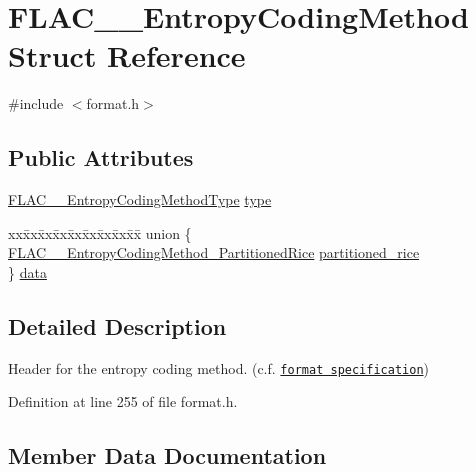 \hypertarget{struct_f_l_a_c_____entropy_coding_method}{}\section{F\+L\+A\+C\+\_\+\+\_\+\+Entropy\+Coding\+Method Struct Reference}
\label{struct_f_l_a_c_____entropy_coding_method}


{\ttfamily \#include $<$format.\+h$>$}

\subsection*{Public Attributes}
\begin{DoxyCompactItemize}
\item 
\hyperlink{group__flac__format_ga951733d2ea01943514290012cd622d3a}{F\+L\+A\+C\+\_\+\+\_\+\+Entropy\+Coding\+Method\+Type} \hyperlink{struct_f_l_a_c_____entropy_coding_method_abe41e84858fd130777b7cc3c27e400f8}{type}
\item 
\begin{tabbing}
xx\=xx\=xx\=xx\=xx\=xx\=xx\=xx\=xx\=\kill
union \{\\
\>\hyperlink{struct_f_l_a_c_____entropy_coding_method___partitioned_rice}{FLAC\_\_EntropyCodingMethod\_PartitionedRice} \hyperlink{struct_f_l_a_c_____entropy_coding_method_a41d493a19d5c01ec7a06a5b3d83adf8b}{partitioned\_rice}\\
\} \hyperlink{struct_f_l_a_c_____entropy_coding_method_a89c2a74756c8626072a796eeb2471ebd}{data}\\

\end{tabbing}\end{DoxyCompactItemize}


\subsection{Detailed Description}
Header for the entropy coding method. (c.\+f. \href{../format.html#residual}{\tt format specification}) 

Definition at line 255 of file format.\+h.



\subsection{Member Data Documentation}

